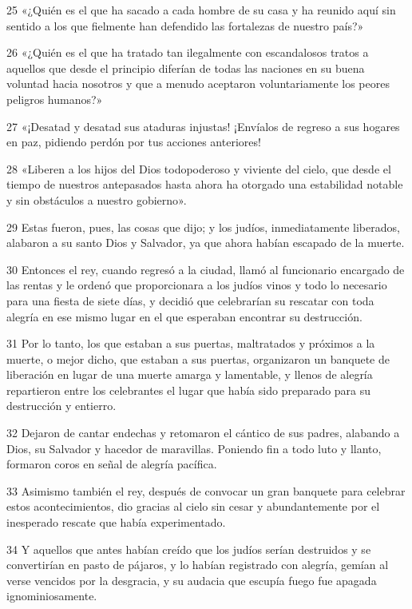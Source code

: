 \par 25 «¿Quién es el que ha sacado a cada hombre de su casa y ha reunido aquí sin sentido a los que fielmente han defendido las fortalezas de nuestro país?»
\par 26 «¿Quién es el que ha tratado tan ilegalmente con escandalosos tratos a aquellos que desde el principio diferían de todas las naciones en su buena voluntad hacia nosotros y que a menudo aceptaron voluntariamente los peores peligros humanos?»
\par 27 «¡Desatad y desatad sus ataduras injustas! ¡Envíalos de regreso a sus hogares en paz, pidiendo perdón por tus acciones anteriores!
\par 28 «Liberen a los hijos del Dios todopoderoso y viviente del cielo, que desde el tiempo de nuestros antepasados ​​hasta ahora ha otorgado una estabilidad notable y sin obstáculos a nuestro gobierno».
\par 29 Estas fueron, pues, las cosas que dijo; y los judíos, inmediatamente liberados, alabaron a su santo Dios y Salvador, ya que ahora habían escapado de la muerte.
\par 30 Entonces el rey, cuando regresó a la ciudad, llamó al funcionario encargado de las rentas y le ordenó que proporcionara a los judíos vinos y todo lo necesario para una fiesta de siete días, y decidió que celebrarían su rescatar con toda alegría en ese mismo lugar en el que esperaban encontrar su destrucción.
\par 31 Por lo tanto, los que estaban a sus puertas, maltratados y próximos a la muerte, o mejor dicho, que estaban a sus puertas, organizaron un banquete de liberación en lugar de una muerte amarga y lamentable, y llenos de alegría repartieron entre los celebrantes el lugar que había sido preparado para su destrucción y entierro.
\par 32 Dejaron de cantar endechas y retomaron el cántico de sus padres, alabando a Dios, su Salvador y hacedor de maravillas. Poniendo fin a todo luto y llanto, formaron coros en señal de alegría pacífica.
\par 33 Asimismo también el rey, después de convocar un gran banquete para celebrar estos acontecimientos, dio gracias al cielo sin cesar y abundantemente por el inesperado rescate que había experimentado.
\par 34 Y aquellos que antes habían creído que los judíos serían destruidos y se convertirían en pasto de pájaros, y lo habían registrado con alegría, gemían al verse vencidos por la desgracia, y su audacia que escupía fuego fue apagada ignominiosamente.
